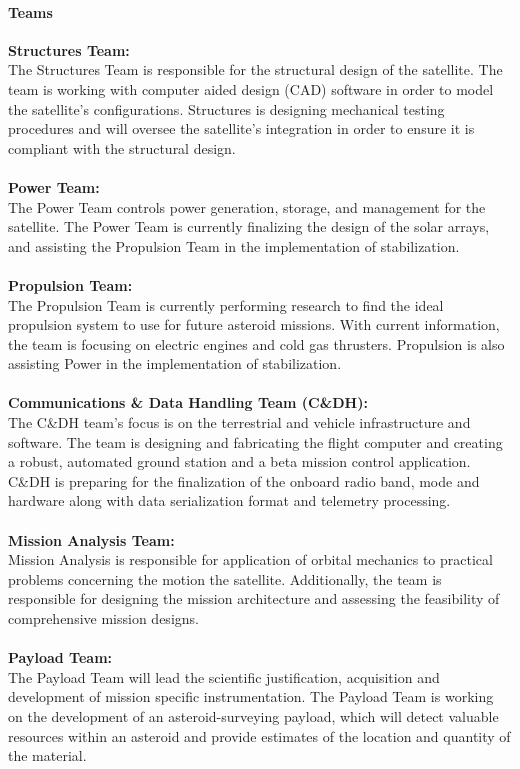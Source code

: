 \documentclass[nocover]            %
{CSLI}                       %
\begin{document}
\paragraph{Teams}
\textbf{Structures Team:}\\
The Structures Team is responsible for the structural design of the satellite. The team is working with computer aided design (CAD) software in order to model the satellite's configurations. Structures is designing mechanical testing procedures and will oversee the satellite's integration in order to  ensure it is compliant with the structural design.\\\\
\textbf{Power Team:}\\
The Power Team controls power generation, storage, and management for the satellite. The Power Team is currently finalizing the design of the solar arrays, and assisting the Propulsion Team in the implementation of stabilization.\\\\
\textbf{Propulsion Team:}\\
The Propulsion Team is currently performing research to find the ideal propulsion system to use for future asteroid missions. With current information, the team is focusing on electric engines and cold gas thrusters. Propulsion is also assisting Power in the implementation of stabilization.\\\\
\textbf{Communications \& Data Handling Team (C\&DH):}\\
The C\&DH team's focus is on the terrestrial and vehicle infrastructure and software. The team is designing and fabricating the flight computer and creating a robust, automated ground station and a beta mission control application. C\&DH is preparing for the finalization of the onboard radio band, mode and hardware along with data serialization format and telemetry processing.\\\\
\textbf{Mission Analysis Team:}\\
Mission Analysis is responsible for application of orbital mechanics to practical problems concerning the motion the satellite. Additionally, the team is responsible for designing the mission architecture and assessing the feasibility of comprehensive mission designs.\\\\
\textbf{Payload Team:}\\
The Payload Team will lead the scientific justification, acquisition and development of mission specific instrumentation. The Payload Team is working on the development of an asteroid-surveying payload, which will detect valuable resources within an asteroid and provide estimates of the location and quantity of the material.
\end{document}
